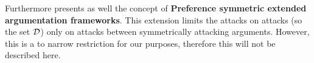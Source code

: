 Furthermore \cite{Modgil2009} presents as well the concept of \textbf{Preference symmetric extended argumentation frameworks}. This extension limits the attacks on attacks (so the set $\mathcal{D}$) only on attacks between symmetrically attacking arguments. However, this is a to narrow restriction for our purposes, therefore this will not be described here. 


